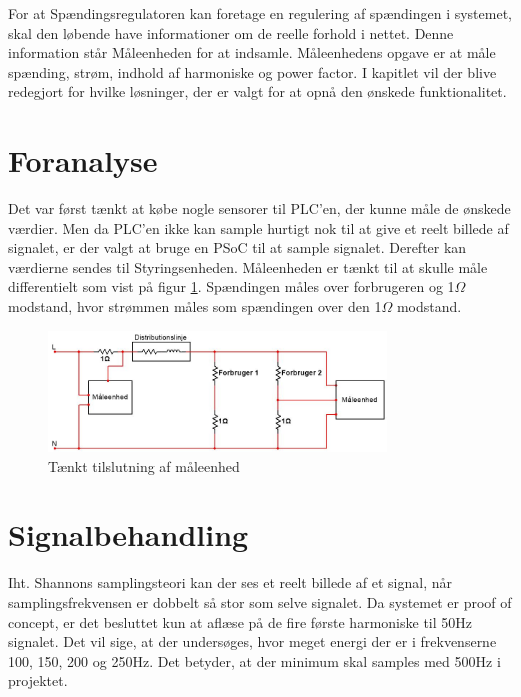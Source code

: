 
For at Spændingsregulatoren kan foretage en regulering af spændingen i systemet, skal den løbende have informationer om de reelle forhold i nettet. Denne information står Måleenheden for at indsamle. Måleenhedens opgave er at måle spænding, strøm, indhold af harmoniske og power factor. I kapitlet vil der blive redegjort for hvilke løsninger, der er valgt for at opnå den ønskede funktionalitet. 

\section{Foranalyse}
Det var først tænkt at købe nogle sensorer til PLC'en, der kunne måle de ønskede værdier. Men da PLC'en ikke kan sample hurtigt nok til at give et reelt billede af signalet, er der valgt at bruge en PSoC til at sample signalet. Derefter kan værdierne sendes til Styringsenheden. Måleenheden er tænkt til at skulle måle differentielt som vist på figur \ref{fig:MaalForanalyse}. Spændingen måles over forbrugeren og 1$\Omega$ modstand, hvor strømmen måles som spændingen over den 1$\Omega$ modstand.

\begin{figure}[H] %
	\centering
	\includegraphics[width=0.8\textwidth]{figure/MaalForanalyse}
	\caption{Tænkt tilslutning af måleenhed}
	\label{fig:MaalForanalyse}
\end{figure}

\section{Signalbehandling}

Iht. Shannons samplingsteori\cite{Shannon} kan der ses et reelt billede af et signal, når samplingsfrekvensen er dobbelt så stor som selve signalet. Da systemet er proof of concept, er det besluttet kun at aflæse på de fire første harmoniske til 50Hz signalet. Det vil sige, at der undersøges, hvor meget energi der er i frekvenserne 100, 150, 200 og 250Hz. Det betyder, at der minimum skal samples med 500Hz i projektet.

